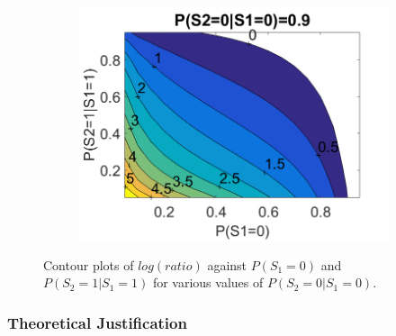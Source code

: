 \documentclass{edm_template}
\begin{document}
\begin{figure}[!ht]
\begin{subfigure}[t]{0.32\linewidth}
				\includegraphics[width=1.05\linewidth]{figures/contour3.png}
				\caption{\label{fig:contour3}}
			\end{subfigure}						
			\caption{Contour plots of $log(ratio)$ against $P(S_1=0)$ and $P(S_2=1|S_1=1)$ for various values of $P(S_2=0|S_1=0)$.\label{fig:contours} }
		\end{figure}

\subsubsection{Theoretical Justification}
\label{sec:theory}
\end{document}
